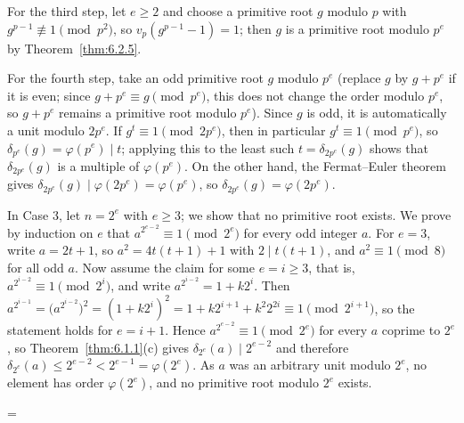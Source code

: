 \documentclass[11pt]{article}
\makeatletter
\theoremstyle{ntstyle}
\let\nt@closedisplay\]
\def\nt@guardedclose{\@ifnextchar\par{\nt@closeafterpar}{\@ifnextchar\end{\postdisplaypenalty\@M\nt@closedisplay}{\nt@closedisplay}}}
\def\nt@closeafterpar\par{\@ifnextchar\par{\nt@closeafterpar}{\@ifnextchar\end{\postdisplaypenalty\@M\nt@closedisplay\par}{\nt@closedisplay\par}}}
\renewenvironment{proof}[1][\proofname]{\par
  \pushQED{\qed}\normalfont\topsep\medskipamount\edef\nt@afterproof{\@endparpenalty=\the\@endparpenalty\relax}\@beginparpenalty\@M\@endparpenalty\@M\let\]\nt@guardedclose\trivlist\item[]\textit{#1\@addpunct{.}} \ignorespaces}{\ifvmode\addpenalty\@M\fi\popQED\nt@afterproof\endtrivlist\@endpefalse}
\makeatother
\begin{document}
\begin{proof}
	For the third step, let $e \ge 2$ and choose a primitive root $g$
	modulo $p$ with $g^{p-1} \not\equiv 1 \pmod{p^2}$, so $v_p(g^{p-1} -
		1) = 1$; then $g$ is a primitive root modulo $p^{e}$ by
	Theorem~\ref{thm:6.2.5}.

	For the fourth step, take an odd primitive root $g$ modulo $p^e$
	(replace $g$ by $g + p^e$ if it is even; since $g+p^e\equiv g\pmod{p^e}$,
	this does not change the order modulo $p^e$, so $g+p^e$ remains a
	primitive root modulo $p^e$). Since $g$ is odd, it is automatically a
	unit modulo $2p^e$. If $g^t\equiv1\pmod{2p^e}$, then in particular
	$g^t\equiv1\pmod{p^e}$, so $\delta_{p^e}(g)=\varphi(p^e)\mid t$; applying this to
	the least such $t=\delta_{2p^e}(g)$ shows that $\delta_{2p^e}(g)$ is a
	multiple of $\varphi(p^e)$. On the other hand, the Fermat--Euler theorem gives
	$\delta_{2p^e}(g)\mid\varphi(2p^e)=\varphi(p^e)$, so
	$\delta_{2p^e}(g)=\varphi(2p^e)$.

	In Case 3, let $n = 2^{e}$ with $e \ge 3$; we show that no primitive root exists. We prove by induction on $e$ that $a^{2^{e-2}}\equiv1\pmod{2^e}$ for every odd integer $a$.
	For $e = 3$, write $a = 2t+1$, so $a^{2} = 4t(t+1) +
		1$ with $2 \mid t(t+1)$, and $a^{2} \equiv 1 \pmod{8}$ for all odd
	$a$. Now assume the claim for some $e = i \ge 3$, that is, $a^{2^{i-2}} \equiv 1 \pmod{2^{i}}$, and write $a^{2^{i-2}} = 1 + k 2^{i}$.
	Then $a^{2^{i-1}} = \big(a^{2^{i-2}}\big)^{2} = (1 + k 2^{i})^{2} = 1
		+ k 2^{i+1} + k^{2} 2^{2i} \equiv 1 \pmod{2^{i+1}}$, so the statement
	holds for $e = i+1$.
	Hence $a^{2^{e-2}} \equiv 1 \pmod{2^e}$ for every $a$ coprime to
	$2^{e}$, so Theorem~\ref{thm:6.1.1}(c) gives $\delta_{2^e}(a) \mid
		2^{e-2}$ and therefore $\delta_{2^e}(a) \le 2^{e-2} < 2^{e-1} =
		\varphi(2^e)$. As $a$ was an arbitrary unit modulo $2^{e}$, no
	element has order $\varphi(2^e)$, and no primitive root modulo
	$2^{e}$ exists.


\end{proof}
\end{document}
